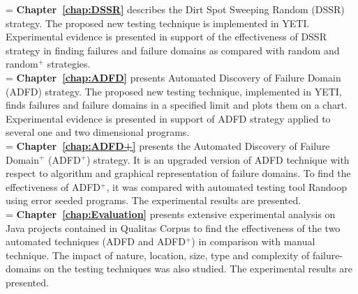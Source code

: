 \hangindent=\parindent
{}
\noindent
\textbf{Chapter~\ref{chap:DSSR}} describes the Dirt Spot Sweeping Random (DSSR) strategy. The proposed new testing technique is implemented in YETI. Experimental evidence is presented in support of the effectiveness of DSSR strategy in finding failures and failure domains as compared with random and random$^+$ strategies. \\

\hangindent=\parindent
{}
\noindent
\textbf{Chapter~\ref{chap:ADFD}} presents Automated Discovery of Failure Domain (ADFD) strategy. The proposed new testing technique, implemented in YETI, finds failures and failure domains in a specified limit and plots them on a chart. Experimental evidence is presented in support of ADFD strategy applied to several one and two dimensional programs. \\

 
\hangindent=\parindent
{}
\noindent
\textbf{Chapter~\ref{chap:ADFD+}} presents the Automated Discovery of Failure Domain$^+$ (ADFD$^+$) strategy. It is an upgraded version of ADFD technique with respect to algorithm and graphical representation of failure domains. To find the effectiveness of ADFD$^+$, it was compared with automated testing tool Randoop using error seeded programs. The experimental results are presented.\\ 


\hangindent=\parindent
{}
\noindent
\textbf{Chapter~\ref{chap:Evaluation}} presents extensive experimental analysis on Java projects contained in Qualitas Corpus to find the effectiveness of the two automated techniques (ADFD and ADFD$^+$) in comparison with manual technique. The impact of nature, location, size, type and complexity of failure-domains on the testing techniques was also studied. The experimental results are presented. \\

